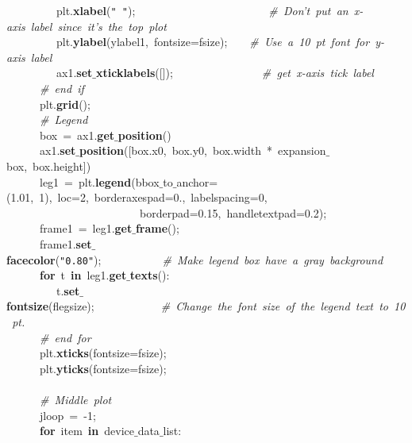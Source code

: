 \mbox{}\ \ \ \ \ \ \ \ \ plt.\textbf{xlabel}(\texttt{"{}\ "{}});\ \ \ \ \ \ \ \ \ \ \ \ \ \ \ \ \ \ \ \ \ \ \ \ \textit{\#\ Don't\ put\ an\ x-axis\ label\ since\ it's\ the\ top\ plot} \\
\mbox{}\ \ \ \ \ \ \ \ \ plt.\textbf{ylabel}(ylabel1,\ fontsize=fsize);\ \ \ \ \textit{\#\ Use\ a\ 10\ pt\ font\ for\ y-axis\ label} \\
\mbox{}\ \ \ \ \ \ \ \ \ ax1.\textbf{set$\_$xticklabels}([]);\ \ \ \ \ \ \ \ \ \ \ \ \ \ \ \ \textit{\#\ get\ x-axis\ tick\ label} \\
\mbox{}\ \ \ \ \ \ \textit{\#\ end\ if} \\
\mbox{}\ \ \ \ \ \ plt.\textbf{grid}(); \\
\mbox{}\ \ \ \ \ \ \textit{\#\ Legend} \\
\mbox{}\ \ \ \ \ \ box\ =\ ax1.\textbf{get$\_$position}() \\
\mbox{}\ \ \ \ \ \ ax1.\textbf{set$\_$position}([box.x0,\ box.y0,\ box.width\ *\ expansion$\_$box,\ box.height]) \\
\mbox{}\ \ \ \ \ \ leg1\ =\ plt.\textbf{legend}(bbox$\_$to$\_$anchor=(1.01,\ 1),\ loc=2,\ borderaxespad=0.,\ labelspacing=0,\  \\
\mbox{}\ \ \ \ \ \ \ \ \ \ \ \ \ \ \ \ \ \ \ \ \ \ \ \ borderpad=0.15,\ handletextpad=0.2); \\
\mbox{}\ \ \ \ \ \ frame1\ =\ leg1.\textbf{get$\_$frame}(); \\
\mbox{}\ \ \ \ \ \ frame1.\textbf{set$\_$facecolor}(\texttt{"{}0.80"{}});\ \ \ \ \ \ \ \ \ \ \ \textit{\#\ Make\ legend\ box\ have\ a\ gray\ background} \\
\mbox{}\ \ \ \ \ \ \textbf{for}\ t\ \textbf{in}\ leg1.\textbf{get$\_$texts}(): \\
\mbox{}\ \ \ \ \ \ \ \ \ t.\textbf{set$\_$fontsize}(flegsize);\ \ \ \ \ \ \ \ \ \ \ \ \textit{\#\ Change\ the\ font\ size\ of\ the\ legend\ text\ to\ 10\ pt.} \\
\mbox{}\ \ \ \ \ \ \textit{\#\ end\ for} \\
\mbox{}\ \ \ \ \ \ plt.\textbf{xticks}(fontsize=fsize); \\
\mbox{}\ \ \ \ \ \ plt.\textbf{yticks}(fontsize=fsize); \\
\mbox{}\ \ \ \ \ \  \\
\mbox{}\ \ \ \ \ \ \textit{\#\ Middle\ plot} \\
\mbox{}\ \ \ \ \ \ jloop\ =\ -1; \\
\mbox{}\ \ \ \ \ \ \textbf{for}\ item\ \textbf{in}\ device$\_$data$\_$list: \\
